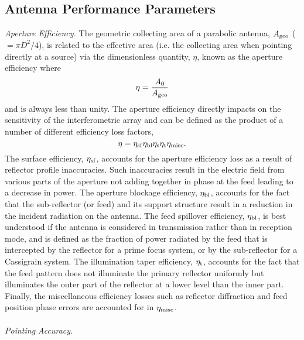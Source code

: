 \subsection{Antenna Performance Parameters}\label{subsec:3}
\textit{Aperture Efficiency.} The geometric collecting area of a parabolic antenna, $A_{\rm{geo}}$ ($=\pi D^2/4$), is related to the effective area (i.e. the collecting area when pointing directly at a source) via the dimensionless quantity, $\eta$, known as the aperture efficiency where
\begin{equation}
\eta = \frac{A_0}{A_{\rm{geo}}} 
\end{equation}
and is always less than unity. The aperture efficiency directly impacts on the sensitivity of the interferometric array and can be defined as the product of a number of different efficiency loss factors, 
\begin{equation}
\eta = \eta _{\rm{sf}}\eta _{\rm{bl}}\eta _{\rm{s}}\eta _{\rm{t}}\eta _{\rm{misc}}.
\end{equation}
The surface efficiency, $\eta _{\rm{sf}}$, accounts for the aperture efficiency loss as a result of reflector profile inaccuracies. Such inaccuracies result in the electric field from various parts of the aperture not adding together in phase at the feed leading to a decrease in power. The aperture blockage efficiency, $\eta _{\rm{bl}}$, accounts for the fact that the sub-reflector (or feed) and its support structure result in a reduction in the incident radiation on the antenna. The feed spillover efficiency, $\eta _{\rm{bl}}$, is best understood if the antenna is considered in transmission rather than in reception mode, and  is defined as the fraction of power radiated by the feed that is intercepted by the reflector for a prime focus system, or by the sub-reflector for a Cassigrain system. The illumination taper efficiency, $\eta _{\rm{t}}$, accounts for the fact that the feed pattern does not illuminate the primary reflector uniformly but illuminates the outer part of the reflector at a lower level than the inner part. Finally, the miscellaneous efficiency losses such as reflector diffraction and feed position phase errors are accounted for in $\eta _{\rm{misc}}$.
\\
\\
\textit{Pointing Accuracy.}
